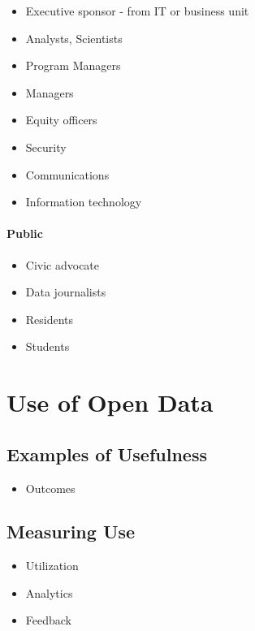 \documentclass[
  openany]{book}
\providecommand{\tightlist}{%
  \setlength{\itemsep}{0pt}\setlength{\parskip}{0pt}}
\begin{document}
\begin{itemize}
\tightlist
\item
  Executive sponsor - from IT or business unit
\item
  Analysts, Scientists
\item
  Program Managers
\item
  Managers
\item
  Equity officers
\item
  Security
\item
  Communications
\item
  Information technology
\end{itemize}

\hypertarget{public}{%
\subsubsection{Public}\label{public}}

\begin{itemize}
\tightlist
\item
  Civic advocate
\item
  Data journalists
\item
  Residents
\item
  Students
\end{itemize}

\hypertarget{use}{%
\chapter{Use of Open Data}\label{use}}

\hypertarget{examples-of-usefulness}{%
\section{Examples of Usefulness}\label{examples-of-usefulness}}

\begin{itemize}
\tightlist
\item
  Outcomes
\end{itemize}

\hypertarget{measuring-use}{%
\section{Measuring Use}\label{measuring-use}}

\begin{itemize}
\tightlist
\item
  Utilization
\item
  Analytics
\item
  Feedback
\end{itemize}
\end{document}
